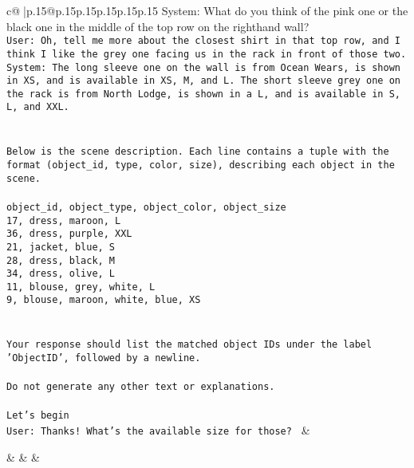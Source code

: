 \documentclass{article}
\begin{document}
{\begin{supertabular}{c@{$\;$}|p{.15\linewidth}@{}p{.15\linewidth}p{.15\linewidth}p{.15\linewidth}p{.15\linewidth}p{.15\linewidth}}
{{{System: What do you think of the pink one or the black one in the middle of the top row on the righthand wall?\\ \tt User: Oh, tell me more about the closest shirt in that top row, and I think I like the grey one facing us in the rack in front of those two.\\ \tt System: The long sleeve one on the wall is from Ocean Wears, is shown in XS, and is available in XS, M, and L. The short sleeve grey one on the rack is from North Lodge, is shown in a L, and is available in S, L, and XXL.\\ \tt \\ \tt \\ \tt Below is the scene description. Each line contains a tuple with the format (object_id, type, color, size), describing each object in the scene.\\ \tt \\ \tt object_id, object_type, object_color, object_size\\ \tt 17, dress, maroon, L\\ \tt 36, dress, purple, XXL\\ \tt 21, jacket, blue, S\\ \tt 28, dress, black, M\\ \tt 34, dress, olive, L\\ \tt 11, blouse, grey, white, L\\ \tt 9, blouse, maroon, white, blue, XS\\ \tt \\ \tt \\ \tt Your response should list the matched object IDs under the label 'ObjectID', followed by a newline.\\ \tt \\ \tt Do not generate any other text or explanations.\\ \tt \\ \tt Let's begin\\ \tt User: Thanks! What's the available size for those? 
	  } 
	   } 
	   } 
	 & \\ 
 

    \theutterance {}  

    &  
	 & & \\ 
 

    \theutterance {}  


\end{supertabular}}
\end{document}
